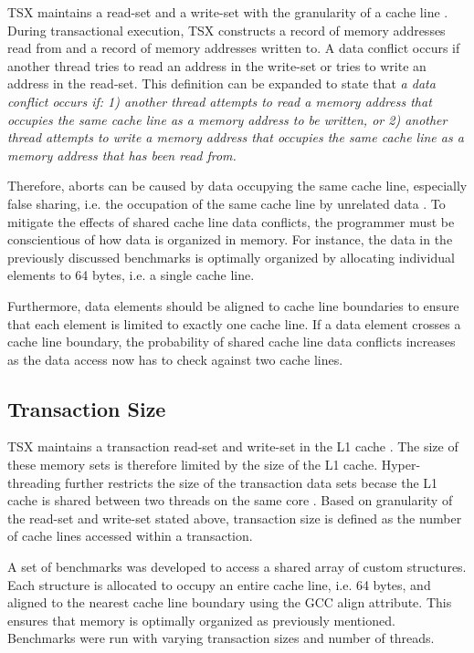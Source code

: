 \documentclass[a4paper]{article}
\begin{document}
\indent 
TSX maintains a read-set and a write-set with the granularity of a cache line
\cite{intel_prog_man}.  During transactional execution, TSX constructs a
record of memory addresses read from and a record of memory addresses written
to.  A data conflict occurs if another thread tries to read an address in the
write-set or tries to write an address in the read-set.  This definition can be
expanded to state that \textit{a data conflict occurs if: 1) another thread attempts to
read a memory address that occupies the same cache line as a memory address to
be written, or 2) another thread attempts to write a memory address that
occupies the same cache line as a memory address that has been read from.}
\par

\indent 
Therefore, aborts can be caused by data occupying the same cache line,
especially false sharing, i.e. the occupation of the same cache line by
unrelated data \cite{intel_opt_man}.  To mitigate the effects of shared
cache line data conflicts, the programmer must be conscientious of how data is
organized in memory.  For instance, the data in the previously discussed
benchmarks is optimally organized by allocating individual elements to 64 bytes,
i.e. a single cache line.
\par

\indent 
Furthermore, data elements should be aligned to cache line boundaries
to ensure that each element is limited to exactly one cache line.  If a data
element crosses a cache line boundary, the probability of shared cache line data
conflicts increases as the data access now has to check against two cache lines.  
\par

\subsection{\textbf{Transaction Size}}

\indent
TSX maintains a transaction read-set and write-set in the L1 cache
\cite{intel_opt_man}.  The size of these memory sets is therefore limited by
the size of the L1 cache.  Hyper-threading further restricts the size of the
transaction data sets becase the L1 cache is shared between two threads on the
same core \cite{intel_opt_man}.  Based on granularity of the read-set and write-set stated
above, transaction size is defined as the number of cache lines accessed within
a transaction.  
\par 

\indent
A set of benchmarks was developed to access a shared array of custom structures. Each
structure is allocated to occupy an entire cache line, i.e. 64 bytes, and
aligned to the nearest cache line boundary using the GCC align attribute.  This
ensures that memory is optimally organized as previously mentioned.  Benchmarks
were run with varying transaction sizes and number of threads.
\par
\end{document}
